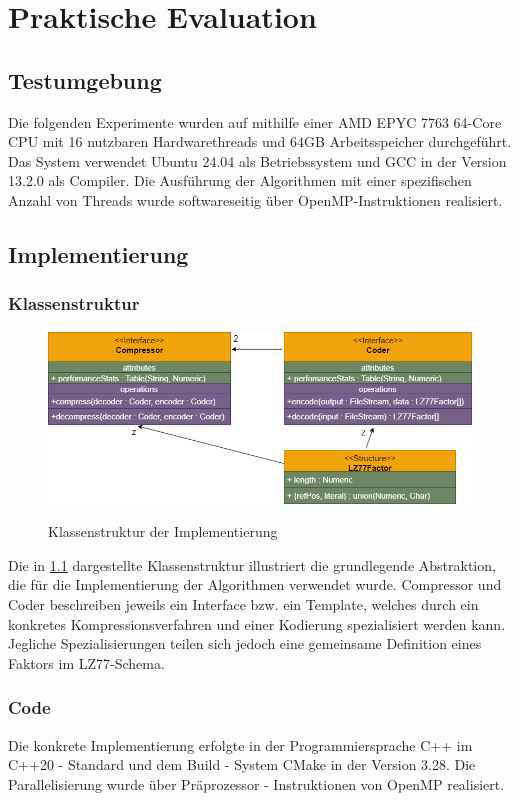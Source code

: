 \chapter{Praktische Evaluation}

\section{Testumgebung}
Die folgenden Experimente wurden auf mithilfe einer AMD EPYC 7763 64-Core CPU mit 16 nutzbaren Hardwarethreads und 64GB Arbeitsspeicher durchgeführt. Das System
verwendet Ubuntu 24.04 als Betriebssystem und GCC in der Version 13.2.0 als Compiler. Die Ausführung der Algorithmen mit einer spezifischen Anzahl von Threads wurde
softwareseitig über OpenMP-Instruktionen realisiert. 

\section{Implementierung}

\subsection{Klassenstruktur}
\begin{figure}[h]
    \centering
    \caption{Klassenstruktur der Implementierung}
    \includegraphics[scale=0.4]{Images/uml.png} \label{uml}
\end{figure}

Die in \ref{uml} dargestellte Klassenstruktur illustriert die grundlegende Abstraktion, die für die Implementierung der Algorithmen verwendet wurde. Compressor und
Coder beschreiben jeweils ein Interface bzw. ein Template, welches durch ein konkretes Kompressionsverfahren und einer Kodierung spezialisiert werden kann. Jegliche
Spezialisierungen teilen sich jedoch eine gemeinsame Definition eines Faktors im LZ77-Schema.

\subsection{Code}
Die konkrete Implementierung erfolgte in der Programmiersprache C++ im C++20 - Standard und dem Build - System CMake in der Version 3.28. Die Parallelisierung wurde
über Präprozessor - Instruktionen von OpenMP realisiert.

